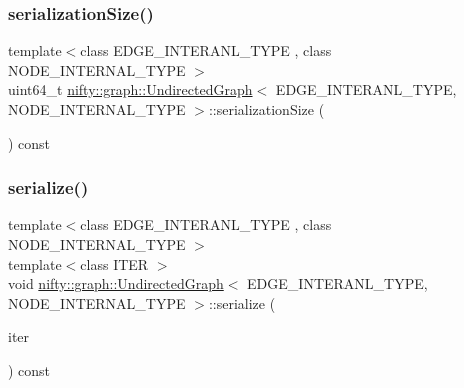 \subsubsection{\texorpdfstring{serialization\+Size()}{serializationSize()}}
{\footnotesize\ttfamily template$<$class E\+D\+G\+E\+\_\+\+I\+N\+T\+E\+R\+A\+N\+L\+\_\+\+T\+Y\+PE , class N\+O\+D\+E\+\_\+\+I\+N\+T\+E\+R\+N\+A\+L\+\_\+\+T\+Y\+PE $>$ \\
uint64\+\_\+t \hyperlink{classnifty_1_1graph_1_1UndirectedGraph}{nifty\+::graph\+::\+Undirected\+Graph}$<$ E\+D\+G\+E\+\_\+\+I\+N\+T\+E\+R\+A\+N\+L\+\_\+\+T\+Y\+PE, N\+O\+D\+E\+\_\+\+I\+N\+T\+E\+R\+N\+A\+L\+\_\+\+T\+Y\+PE $>$\+::serialization\+Size (\begin{DoxyParamCaption}{ }\end{DoxyParamCaption}) const}

\mbox{\label{classnifty_1_1graph_1_1UndirectedGraph_a482c06ee7f8b1acd32897c45a4de436e}} 
\subsubsection{\texorpdfstring{serialize()}{serialize()}}
{\footnotesize\ttfamily template$<$class E\+D\+G\+E\+\_\+\+I\+N\+T\+E\+R\+A\+N\+L\+\_\+\+T\+Y\+PE , class N\+O\+D\+E\+\_\+\+I\+N\+T\+E\+R\+N\+A\+L\+\_\+\+T\+Y\+PE $>$ \\
template$<$class I\+T\+ER $>$ \\
void \hyperlink{classnifty_1_1graph_1_1UndirectedGraph}{nifty\+::graph\+::\+Undirected\+Graph}$<$ E\+D\+G\+E\+\_\+\+I\+N\+T\+E\+R\+A\+N\+L\+\_\+\+T\+Y\+PE, N\+O\+D\+E\+\_\+\+I\+N\+T\+E\+R\+N\+A\+L\+\_\+\+T\+Y\+PE $>$\+::serialize (\begin{DoxyParamCaption}\item[{I\+T\+ER}]{iter }\end{DoxyParamCaption}) const}

\mbox{\label{classnifty_1_1graph_1_1UndirectedGraph_a4d1abbc35f94744412a9f6474d922e59}} 
